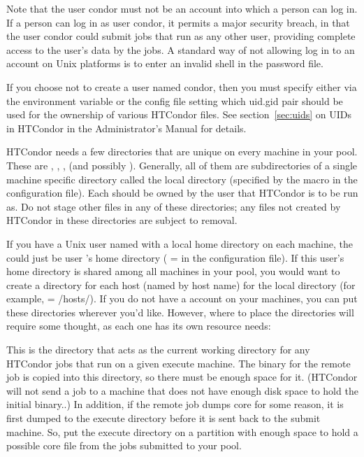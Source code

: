 \begin{description}
Note that the user condor must not be an account into which a person
can log in.
If a person can log in as user condor, 
it permits a major security breach,
in that the user condor could submit jobs that run as any other user,
providing complete access to the user's data by the jobs. 
A standard way of not allowing log in to an account on Unix platforms
is to enter an invalid shell in the password file.

If you choose not to create a user named condor,
then you must specify either via the
 environment variable or the 
config file setting which uid.gid pair should be used for
the ownership of various HTCondor files.  
See section~\ref{sec:uids} on UIDs in HTCondor
in the Administrator's Manual for details.

\item[6. Where should the machine-specific directories for
HTCondor go?]

HTCondor needs a few directories that are unique on every machine in
your pool.  These are 
,
, 
,
(and possibly ). 
Generally, all
of them are subdirectories of a single machine specific directory called
the local directory (specified by the  macro
in the configuration file).
Each should be owned by the user that HTCondor is to be run as.
Do not stage other files in any of these directories;
any files not created by HTCondor in these directories are subject to removal.

If you have a Unix user named  with a local home directory on each
machine, the  could just be user 's home
directory ( =  in the 
configuration file).
If this user's home directory is shared among all machines in your
pool, you would want to create a directory for each host (named by
host name) for the local directory (for example,  =
/hosts/).  If you do not
have a  account on your machines, you can put these directories
wherever you'd like.
However, where to place the directories will require some
thought, as each one has its own resource needs:

\begin{description}
\item[\File{execute}] This is the directory that acts as the current working
directory for any HTCondor jobs that run on a given execute machine.
The binary for the remote job is copied into this directory, so
there
must be enough space for it.  (HTCondor will not send a job to a
machine that does not have enough disk space to hold the initial
binary..)  In addition, if the remote job dumps core for some reason,
it is first dumped to the execute directory before it is sent back to
the submit machine.  So, put the execute directory on
a partition with enough space to hold a possible core file from the
jobs submitted to your pool.


\end{description}
\end{description}
